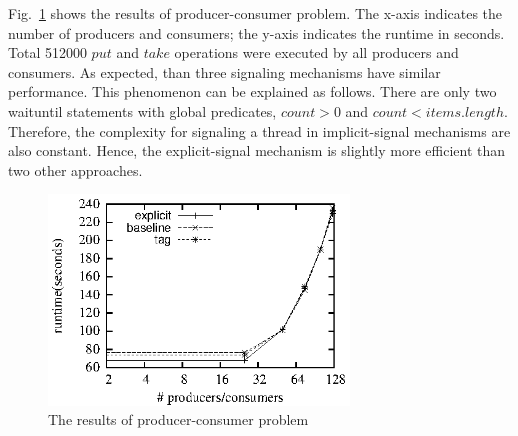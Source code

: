 \documentclass[preprint]{sigplanconf}
\begin{document}
%
Fig.~\ref{fig:pc_eval} shows the results of producer-consumer problem. The
x-axis indicates the number of producers and consumers; the y-axis indicates the
runtime in seconds. Total 512000 $put$ and $take$ operations were executed by
all producers and consumers. As expected, than three signaling mechanisms have 
similar performance. This phenomenon can be explained as follows. There are 
only two waituntil statements with global predicates, $count > 0$ and 
$count < items.length$. Therefore, the complexity for signaling a thread in
implicit-signal mechanisms are also constant. Hence, the explicit-signal
mechanism is slightly more efficient than two other approaches. 
\begin{figure}[ht!]
  \centering
  \includegraphics[width=80mm]{fig/pc.eps}
  \caption{The results of producer-consumer problem}
  \label{fig:pc_eval}
\end{figure}
\end{document}
